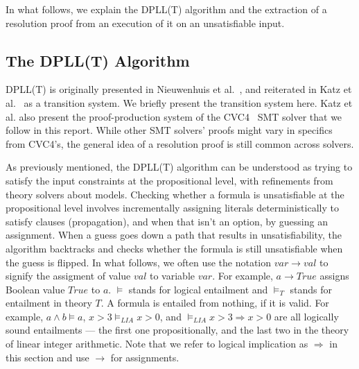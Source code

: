 \documentclass{article}
\begin{document}
	In what follows, we explain the 
	DPLL(T) algorithm and the 
	extraction of a resolution proof
	from an execution of it on an 
	unsatisfiable input.
	
	\subsection{The DPLL(T) Algorithm}
	\label{dpllt}
	
	DPLL(T) is originally presented 
	in Nieuwenhuis et al.~\cite{DBLP:journals/jacm/NieuwenhuisOT06}, 
	and reiterated in Katz et 
	al.~\cite{DBLP:conf/fmcad/KatzBTRH16} 
	as a transition system. We briefly present 
	the transition system here. Katz et al. also 
	present the proof-production system of the 
	CVC4~\cite{DBLP:conf/cav/BarrettCDHJKRT11} 
	SMT solver that we follow 
	in this report. While other SMT solvers'
	proofs might vary in specifics from 
	CVC4's, the general idea of a 
	resolution proof is still common 
	across solvers.
	
	As previously mentioned, the DPLL(T)
	algorithm can be understood as 
	trying to satisfy the input constraints
	at the propositional level, with 
	refinements from theory solvers
	about models. Checking whether a
	formula is unsatisfiable at the 
	propositional level involves 
	incrementally assigning literals
	deterministically to satisfy clauses
	(propagation), and when that isn't an 
	option, by guessing an 
	assignment. When a guess goes 
	down a path that results in 
	unsatisfiability, the algorithm 
	backtracks and checks whether the 
	formula is still unsatisfiable 
	when the guess is flipped. In 
	what follows, we often use the 
	notation $var \to val$ to 
	signify the assigment of value 
	$val$ to variable $var$. For 
	example, $a \to True$
	assigns Boolean value $True$ to 
	$a$. $\models$ stands for logical 
	entailment and $\models_T$ stands 
	for entailment in theory $T$. A 
	formula is entailed from nothing, 
	if it is valid. For example, 
	$a \land b \models a$,
	$x > 3 \models_{LIA} x > 0$, and 
	$\models_{LIA} x > 3 \Rightarrow 
	x > 0$ are all logically sound 
	entailments --- the first one 
	propositionally, and the
	last two in the theory of linear 
	integer arithmetic. Note that we 
	refer to logical implication as 
	$\Rightarrow$ in this section and 
	use $\to$ for assignments.
	
\end{document}
